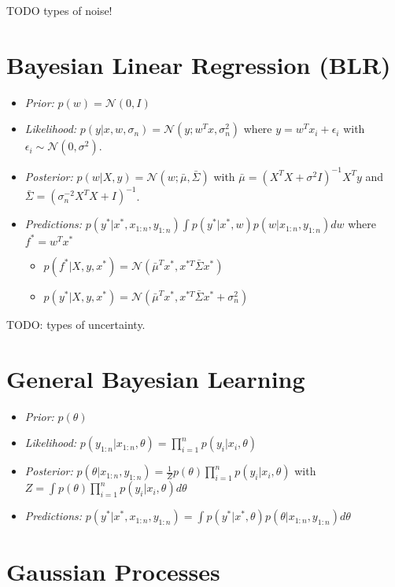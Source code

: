 \documentclass[11pt]{article}
\newcommand{\gauss}{\mathcal{N}}
\begin{document}
	
	\begin{multicols*}{3}
	
	
	TODO types of noise!
	\section*{Bayesian Linear Regression (BLR)}
	\begin{itemize}
		\item \textit{Prior:} $p(w) = \gauss (0,I)$
\item \textit{Likelihood:} $p(y|x,w,\sigma_n) = \gauss (y;w^Tx,\sigma^2_{n})$ where $y = w^Tx_i + \epsilon_i$ with $\epsilon_i \sim \gauss(0,\sigma^2)$.
\item \textit{Posterior:} $p(w|X,y) = \gauss(w;\bar{\mu},\bar{\Sigma})$ with $\bar{\mu} = (X^TX + \sigma^2 I )^{-1}X^Ty$ and $\bar{\Sigma} = (\sigma_n^{-2}X^T X + I)^{-1}$.
\item \textit{Predictions:} $ p(y^* | x^*, x_{1:n}, y_{1:n}) \int p(y^*|x^*, w) p(w | x_{1:n}, y_{1:n}) dw$ where $f^* = w^T x^*$
\begin{itemize}
	\item $p(f^*| X,y,x^*) = \gauss(\bar{\mu}^T x^*, x^{*T}\bar{\Sigma} x^*)$
	\item $p(y^*| X,y,x^*) = \gauss(\bar{\mu}^T x^*, x^{*T}\bar{\Sigma} x^* + \sigma_n^2)$
\end{itemize}
	\end{itemize}
	
	TODO: types of uncertainty.
	
	\section*{General Bayesian Learning}
	\begin{itemize}
		\item \textit{Prior:} $p(\theta)$
		\item \textit{Likelihood:} $p(y_{1:n}| x_{1:n}, \theta) = \prod_{i=1}^{n} p(y_i | x_i, \theta)$
		\item \textit{Posterior:} $p(\theta | x_{1:n}, y_{1:n}) = \frac{1}{Z} p(\theta) \prod_{i=1}^{n} p(y_i | x_i, \theta)$ with $Z = \int p(\theta) \prod_{i=1}^{n} p(y_i | x_i, \theta) d\theta$
		\item \textit{Predictions:} $p(y^* | x^*, x_{1:n}, y_{1:n}) = \int p(y^*|x^*, \theta)p(\theta | x_{1:n}, y_{1:n}) d\theta$
	\end{itemize}
	
	\section*{Gaussian Processes}
	

\end{multicols*}
\end{document}
